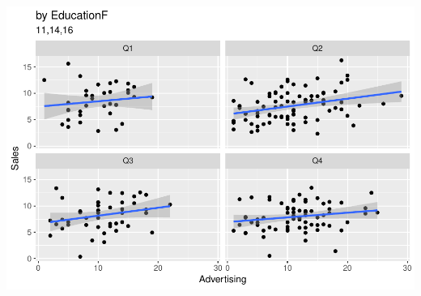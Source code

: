 \documentclass[a4paper]{article}
\begin{document}
\includegraphics{class3_rmd_pdf_files/figure-latex/unnamed-chunk-9-4.pdf}
\end{document}
